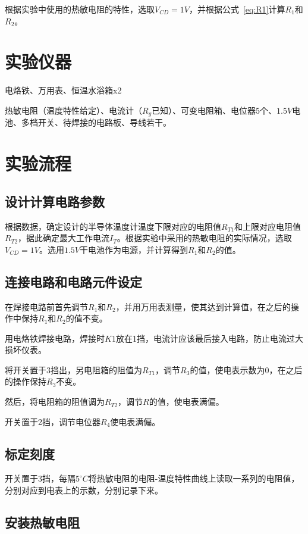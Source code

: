 \documentclass[a4paper]{ltxdoc}
\begin{document}
\begin{multicols}{2}
    根据实验中使用的热敏电阻的特性，选取$V_{CD} = 1V$，并根据公式~\ref{eq:R1}计算$R_1$和$R_2$。

    \section{实验仪器}
    电烙铁、万用表、恒温水浴箱x2

    热敏电阻（温度特性给定）、电流计（$R_g$已知）、可变电阻箱、电位器5个、$1.5V$电池、多档开关、待焊接的电路板、导线若干。

    \section{实验流程}
    \subsection{设计计算电路参数}

    根据数据，确定设计的半导体温度计温度下限对应的电阻值$R_{T1}$和上限对应电阻值$R_{T2}$，据此确定最大工作电流$I_T$。根据实验中采用的热敏电阻的实际情况，选取$V_{CD} = 1V$。选用$1.5V$干电池作为电源，并计算得到$R_1$和$R_2$的值。

    \subsection{连接电路和电路元件设定}

    在焊接电路前首先调节$R_1$和$R_2$，并用万用表测量，使其达到计算值，在之后的操作中保持$R_1$和$R_2$的值不变。

    用电烙铁焊接电路，焊接时$K1$放在1挡，电流计应该最后接入电路，防止电流过大损坏仪表。

    将开关置于3挡出，另电阻箱的阻值为$R_{T1}$，调节$R_3$的值，使电表示数为0，在之后的操作保持$R_3$不变。

    然后，将电阻箱的阻值调为$R_{T2}$，调节$R$的值，使电表满偏。

    开关置于2挡，调节电位器$R_4$使电表满偏。

    \subsection{标定刻度}

    开关置于3挡，每隔$5^{\circ}C$将热敏电阻的电阻-温度特性曲线上读取一系列的电阻值，分别对应到电表上的示数，分别记录下来。

    \subsection{安装热敏电阻}


\end{multicols}
\end{document}
